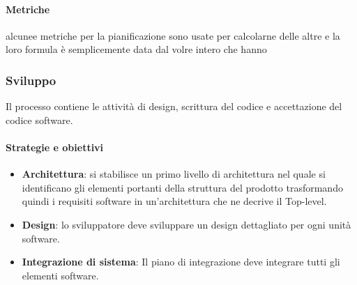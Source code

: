            \paragraph{Metriche}
           alcunee metriche per la pianificazione sono usate per calcolarne delle altre e la loro formula è semplicemente data dal volre intero che hanno
            \def\productquality{
            {   Budget at Completion [BG],
                numero intero, 
                $ \pm 5 \% $ del preventivo,
                pari al preventivo
            },
            {   Earned value [EV],
                BAC - $\%$ di lavoro completato, 
                $ >0$,
                $ >0$
            },
            {   Planned value [PV],
                valore pianificato nel momento del calcolo, 
                $ >0$,
                $ >0$
            },
            {  Acual cost [AC],
               numero intero, 
                0 < AC $\leq$ budget totale,
                0 < AC $\leq$ PV
            },
            {   Schedule variance [SV],
               SV = EV - PV, 
                $ >0$,
                $ 0$
            },
            {    Cost variance [CV],
               CV = EV - AC, 
                $ >0$,
                $ \geq 0$
            },
        }
 


    \newpage    
    \subsubsection{Sviluppo}
    Il processo contiene le attività di design, scrittura del codice e accettazione del codice software.
    
        \paragraph{Strategie e obiettivi}
        \begin{itemize}
            \item \textbf{Architettura}: si stabilisce un primo livello di architettura nel quale si identificano gli elementi portanti della struttura del prodotto trasformando quindi i requisiti software in un'architettura che ne decrive il Top-level.
            \item \textbf{Design}: lo sviluppatore deve sviluppare un design dettagliato per ogni unità software.
            \item \textbf{Integrazione di sistema}: Il piano di integrazione deve integrare tutti gli elementi software.
        \end{itemize}
        

